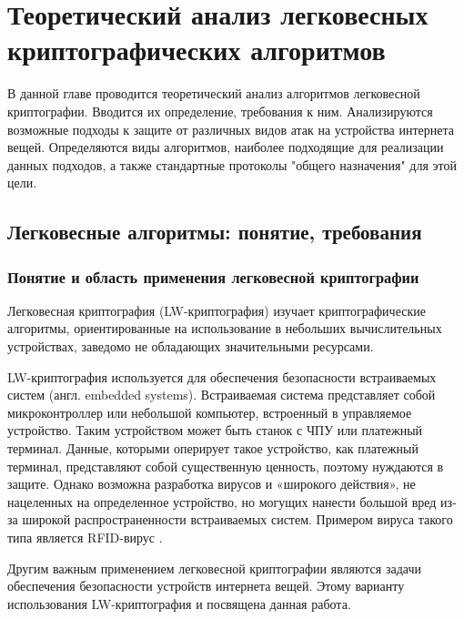 \chapter{Теоретический анализ легковесных криптографических алгоритмов} \label{ch2}
	

В данной главе проводится теоретический анализ алгоритмов легковесной криптографии. Вводится их определение, требования к ним. Анализируются возможные подходы к защите от различных видов атак на устройства интернета вещей. Определяются виды алгоритмов, наиболее подходящие для реализации данных подходов, а также стандартные протоколы "общего назначения" для этой цели.

\section{Легковесные алгоритмы: понятие, требования} \label{ch2:sec1}

\subsection{Понятие и область применения легковесной криптографии} %

Легковесная криптография (LW-криптография) изучает криптографические алгоритмы, ориентированные на использование в небольших вычислительных устройствах, заведомо не обладающих значительными ресурсами.

LW-криптография используется для обеспечения безопасности встраиваемых систем (англ. embedded systems). Встраиваемая система представляет собой микроконтроллер или небольшой компьютер, встроенный в управляемое устройство. Таким устройством может быть станок с ЧПУ или платежный терминал. Данные, которыми оперирует такое устройство, как платежный терминал, представляют собой существенную ценность, поэтому нуждаются в защите. Однако возможна разработка вирусов и «широкого действия», не нацеленных на определенное устройство, но могущих нанести большой вред из-за широкой распространенности встраиваемых систем. Примером вируса такого типа является RFID-вирус \cite{src22}.

Другим важным применением легковесной криптографии являются задачи обеспечения безопасности устройств интернета вещей. Этому варианту использования LW-криптография и посвящена данная работа.

